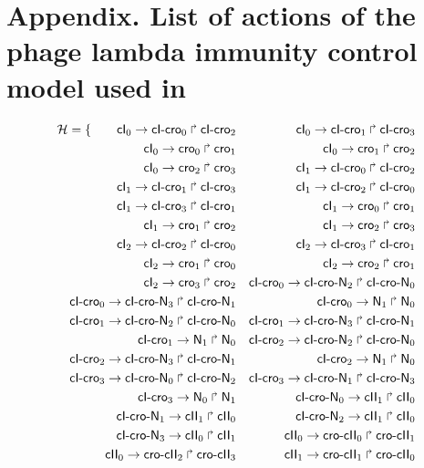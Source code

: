 
\section*{Appendix.
  List of actions of the phage lambda immunity control model used in }


\begin{align*}
\PHh = \{ \qquad
  \PHfrappe{\cI_0}{\cIcro_0}{\cIcro_2} &&
  \PHfrappe{\cI_0}{\cIcro_1}{\cIcro_3} \\
  \PHfrappe{\cI_0}{\cro_0}{\cro_1} &&
  \PHfrappe{\cI_0}{\cro_1}{\cro_2} \\
  \PHfrappe{\cI_0}{\cro_2}{\cro_3} &&
  \PHfrappe{\cI_1}{\cIcro_0}{\cIcro_2} \\
  \PHfrappe{\cI_1}{\cIcro_1}{\cIcro_3} &&
  \PHfrappe{\cI_1}{\cIcro_2}{\cIcro_0} \\
  \PHfrappe{\cI_1}{\cIcro_3}{\cIcro_1} &&
  \PHfrappe{\cI_1}{\cro_0}{\cro_1} \\
  \PHfrappe{\cI_1}{\cro_1}{\cro_2} &&
  \PHfrappe{\cI_1}{\cro_2}{\cro_3} \\
  \PHfrappe{\cI_2}{\cIcro_2}{\cIcro_0} &&
  \PHfrappe{\cI_2}{\cIcro_3}{\cIcro_1} \\
  \PHfrappe{\cI_2}{\cro_1}{\cro_0} &&
  \PHfrappe{\cI_2}{\cro_2}{\cro_1} \\
  \PHfrappe{\cI_2}{\cro_3}{\cro_2} &&
  \PHfrappe{\cIcro_0}{\cIcroN_2}{\cIcroN_0} \\
  \PHfrappe{\cIcro_0}{\cIcroN_3}{\cIcroN_1} &&
  \PHfrappe{\cIcro_0}{\N_1}{\N_0} \\
  \PHfrappe{\cIcro_1}{\cIcroN_2}{\cIcroN_0} &&
  \PHfrappe{\cIcro_1}{\cIcroN_3}{\cIcroN_1} \\
  \PHfrappe{\cIcro_1}{\N_1}{\N_0} &&
  \PHfrappe{\cIcro_2}{\cIcroN_2}{\cIcroN_0} \\
  \PHfrappe{\cIcro_2}{\cIcroN_3}{\cIcroN_1} &&
  \PHfrappe{\cIcro_2}{\N_1}{\N_0} \\
  \PHfrappe{\cIcro_3}{\cIcroN_0}{\cIcroN_2} &&
  \PHfrappe{\cIcro_3}{\cIcroN_1}{\cIcroN_3} \\
  \PHfrappe{\cIcro_3}{\N_0}{\N_1} &&
  \PHfrappe{\cIcroN_0}{\cII_1}{\cII_0} \\
  \PHfrappe{\cIcroN_1}{\cII_1}{\cII_0} &&
  \PHfrappe{\cIcroN_2}{\cII_1}{\cII_0} \\
  \PHfrappe{\cIcroN_3}{\cII_0}{\cII_1} &&
  \PHfrappe{\cII_0}{\crocII_0}{\crocII_1} \\
  \PHfrappe{\cII_0}{\crocII_2}{\crocII_3} &&
  \PHfrappe{\cII_1}{\crocII_1}{\crocII_0} \\

\end{align*}
